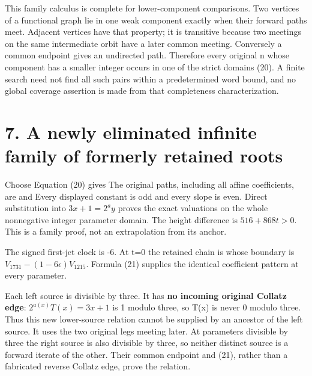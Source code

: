 This family calculus is complete for lower-component comparisons. Two
vertices of a functional graph lie in one weak component exactly when
their forward paths meet. Adjacent vertices have that property; it is
transitive because two meetings on the same intermediate orbit have a
later common meeting. Conversely a common endpoint gives an undirected
path. Therefore every original n whose component has a smaller integer
occurs in one of the strict domains (20). A finite search need not find
all such pairs within a predetermined word bound, and no global coverage
assertion is made from that completeness characterization.

\section{7. A newly eliminated infinite family of formerly retained
roots}

Choose  Equation (20)
gives
The original paths, including all affine coefficients, are
 and
 Every displayed constant is odd and every slope is
even. Direct substitution into \(3x+1=2^ay\) proves the exact valuations
on the whole nonnegative integer parameter domain. The height difference
is \(516+868t>0\). This is a family proof, not an extrapolation from its
anchor.

The signed first-jet clock is -6. At t=0 the retained chain is
 whose boundary
is \(V_{1731}-(1-6\epsilon)V_{1215}\). Formula (21) supplies the
identical coefficient pattern at every parameter.

Each left source is divisible by three. It has \textbf{no incoming
original Collatz edge}: \(2^{a(x)}T(x)=3x+1\) is 1 modulo three, so T(x)
is never 0 modulo three. Thus this new lower-source relation cannot be
supplied by an ancestor of the left source. It uses the two original
legs meeting later. At parameters divisible by three the right source is
also divisible by three, so neither distinct source is a forward iterate
of the other. Their common endpoint and (21), rather than a fabricated
reverse Collatz edge, prove the relation.

